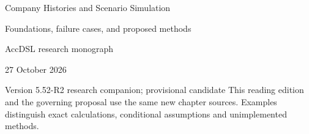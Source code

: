 \documentclass[11pt,a4paper]{report}
\begin{document}
\hypersetup{pageanchor=false}
\begin{titlepage}
{\Huge Company Histories and Scenario Simulation\par}
\vspace{12mm}
{\Large Foundations, failure cases, and proposed methods\par}
\vspace{8mm}
AccDSL research monograph\par 27 October 2026\par Version 5.52-R2 research companion; provisional candidate
\vfill
This reading edition and the governing proposal use the same new chapter sources. Examples distinguish exact calculations, conditional assumptions and unimplemented methods.
\end{titlepage}
\hypersetup{pageanchor=true}
\tableofcontents
\clearpage{}


























\clearpage\label{sim:body-end}

\begingroup\raggedright
\endgroup
\end{document}
